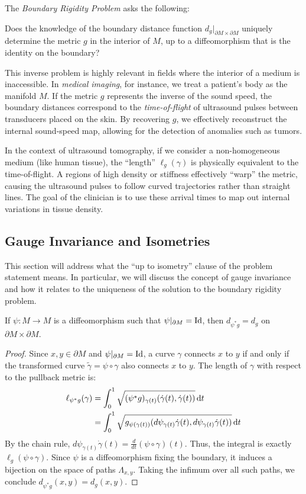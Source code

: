 The \emph{Boundary Rigidity Problem} asks the following:
\begin{problem}
  Does the knowledge of the boundary distance function $d_g|_{\partial M \times \partial M}$ uniquely determine the metric $g$ in the interior of $M$, up to a diffeomorphism that is the identity on the boundary?
\end{problem}

This inverse problem is highly relevant in fields where the interior of a medium is inaccessible. In \emph{medical imaging}, for instance, we treat a patient's body as the manifold $M$. If the metric $g$ represents the inverse of the sound speed, the boundary distances correspond to the \emph{time-of-flight} of ultrasound pulses between transducers placed on the skin. By recovering $g$, we effectively reconstruct the internal sound-speed map, allowing for the detection of anomalies such as tumors.

In the context of ultrasound tomography, if we consider a non-homogeneous medium (like human tissue), the ``length'' $\ell_g(\gamma)$ is physically equivalent to the time-of-flight. A regions of high density or stiffness effectively ``warp'' the metric, causing the ultrasound pulses to follow curved trajectories rather than straight lines. The goal of the clinician is to use these arrival times to map out internal variations in tissue density.

\subsection{Gauge Invariance and Isometries} This section will address what the ``up to isometry'' clause of the problem statement means. In particular, we will discuss the concept of gauge invariance and how it relates to the uniqueness of the solution to the boundary rigidity problem.
\begin{lemma}
  If $\psi : M \to M$ is a diffeomorphism such that $\psi|_{\partial M} = \operatorname{Id}$, then $d_{\psi^*g} = d_g$ on $\partial M \times \partial M$.
\end{lemma}
\begin{proof}
  Since $x, y \in \partial M$ and $\psi|_{\partial M} = \operatorname{Id}$, a curve $\gamma$ connects $x$ to $y$ if and only if the transformed curve $\tilde{\gamma} = \psi \circ \gamma$ also connects $x$ to $y$. The length of $\gamma$ with respect to the pullback metric is:
  \begin{align*}
    \ell_{\psi^*g}(\gamma) &= \int_0^1 \sqrt{(\psi^*g)_{\gamma(t)}(\dot{\gamma}(t), \dot{\gamma}(t))} \dt \\
                           &= \int_0^1 \sqrt{g_{\psi(\gamma(t))}(d\psi_{\gamma(t)}\dot{\gamma}(t), d\psi_{\gamma(t)}\dot{\gamma}(t))} \dt
  \end{align*}
  By the chain rule, $d\psi_{\gamma(t)}\dot{\gamma}(t) = \frac{d}{dt}(\psi \circ \gamma)(t)$. Thus, the integral is exactly $\ell_g(\psi \circ \gamma)$. Since $\psi$ is a diffeomorphism fixing the boundary, it induces a bijection on the space of paths $\Lambda_{x,y}$. Taking the infimum over all such paths, we conclude $d_{\psi^*g}(x, y) = d_g(x, y)$.
\end{proof}

